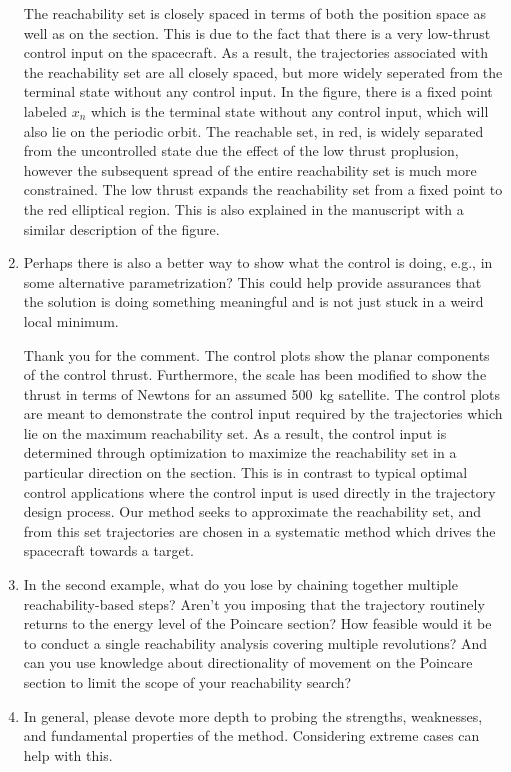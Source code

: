 \documentclass[11pt]{article}
\begin{document}
\begin{enumerate}
The reachability set is closely spaced in terms of both the position space as well as on the \Poincare section.
This is due to the fact that there is a very low-thrust control input on the spacecraft.
As a result, the trajectories associated with the reachability set are all closely spaced, but more widely seperated from the terminal state without any control input.
In the figure, there is a fixed point labeled \( x_n \) which is the terminal state without any control input, which will also lie on the periodic orbit.
The reachable set, in red, is widely separated from the uncontrolled state due the effect of the low thrust proplusion, however the subsequent spread of the entire reachability set is much more constrained.
The low thrust expands the reachability set from a fixed point to the red elliptical region. 
This is also explained in the manuscript with a similar description of the figure.

\item
    \begin{itshape}
Perhaps there is also a better way to show what the control is doing, e.g., in some alternative parametrization?  This could help provide assurances that the solution is doing something meaningful and is not just stuck in a weird local minimum.  
\end{itshape}

Thank you for the comment.
The control plots show the planar components of the control thrust. 
Furthermore, the scale has been modified to show the thrust in terms of Newtons for an assumed \SI{500}{\kilo\gram} satellite.
The control plots are meant to demonstrate the control input required by the trajectories which lie on the maximum reachability set. 
As a result, the control input is determined through optimization to maximize the reachability set in a particular direction on the \Poincare section.
This is in contrast to typical optimal control applications where the control input is used directly in the trajectory design process.
Our method seeks to approximate the reachability set, and from this set trajectories are chosen in a systematic method which drives the spacecraft towards a target.

\item
    \begin{itshape}
In the second example, what do you lose by chaining together multiple reachability-based steps?  Aren't you imposing that the trajectory routinely returns to the energy level of the Poincare section? How feasible would it be to conduct a single reachability analysis covering multiple revolutions? And can you use knowledge about directionality of movement on the Poincare section to limit the scope of your reachability search?
\end{itshape}

\item
    \begin{itshape}
In general, please devote more depth to probing the strengths, weaknesses, and fundamental properties of the method.  Considering extreme cases can help with this.
\end{itshape}
\end{enumerate}


\end{document}
